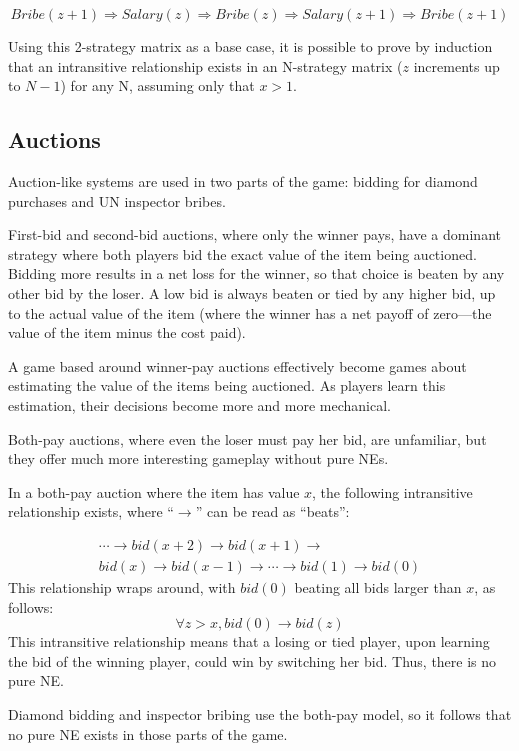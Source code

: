 \documentclass[8pt]{extarticle}
\begin{document}
\[ Bribe(z+1) \Longrightarrow Salary(z) \Longrightarrow Bribe(z) \Longrightarrow Salary(z+1) \Longrightarrow Bribe(z+1)
\]  

Using this 2-strategy matrix as a base case, it is possible to prove by induction that an intransitive relationship exists in an N-strategy matrix ($z$ increments up to $N-1$) for any N, assuming only that $x>1$. 


\subsection{Auctions}
Auction-like systems are used in two parts of the game:  bidding for diamond purchases and UN inspector bribes.

First-bid and second-bid auctions, where only the winner pays, have a dominant strategy where both players bid the exact value of the item being auctioned.  Bidding more results in a net loss for the winner, so that choice is beaten by any other bid by the loser.  A low bid is always beaten or tied by any higher bid, up to the actual value of the item (where the winner has a net payoff of zero---the value of the item minus the cost paid).

A game based around winner-pay auctions effectively become games about estimating the value of the items being auctioned.  As players learn this estimation, their decisions become more and more mechanical.

Both-pay auctions, where even the loser must pay her bid, are unfamiliar, but they offer much more interesting gameplay without pure NEs.

In a both-pay auction where the item has value $x$, the following intransitive relationship exists, where ``$\longrightarrow$'' can be read as ``beats'':

\[ 
\begin{array}{c}
\cdots \longrightarrow bid(x+2) \longrightarrow bid(x+1) \longrightarrow \\
bid(x) \longrightarrow bid(x-1) \longrightarrow \cdots \longrightarrow bid(1) \longrightarrow bid(0)
\end{array}
\]
This relationship wraps around, with $bid(0)$ beating all bids larger than $x$, as follows:
\[ \forall z>x, bid(0) \longrightarrow bid(z) \]
This intransitive relationship means that a losing or tied player, upon learning the bid of the winning player, could win by switching her bid.  Thus, there is no pure NE.

Diamond bidding and inspector bribing use the both-pay model, so it follows that no pure NE exists in those parts of the game.
\end{document}
